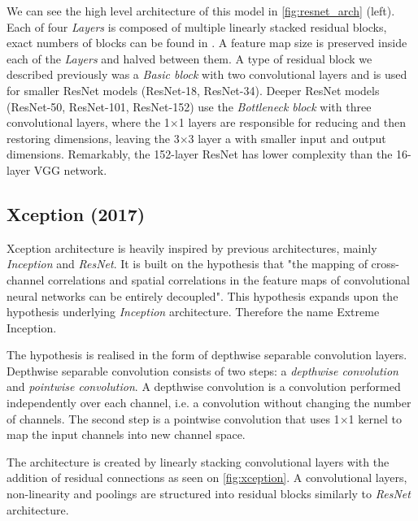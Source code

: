 We can see the high level architecture of this model in \cref{fig:resnet_arch} (left). Each of four \textit{Layers} is composed of multiple linearly stacked residual blocks, exact numbers of blocks can be found in \cite[table 1]{bib:resnet}. A feature map size is preserved inside each of the \textit{Layers} and halved between them. A type of residual block we described previously was a \textit{Basic block} with two convolutional layers and is used for smaller ResNet models (ResNet-18, ResNet-34). Deeper ResNet models (ResNet-50, ResNet-101, ResNet-152) use the \textit{Bottleneck block} with three convolutional layers, where the 1$\times$1 layers are responsible for reducing and then restoring dimensions, leaving the 3$\times$3 layer a with smaller input and output dimensions. Remarkably, the 152-layer ResNet has lower complexity than the 16-layer VGG network.



\subsection{Xception (2017)}
\label{sec:xception}
Xception architecture \cite{bib:xception} is heavily inspired by previous architectures, mainly \textit{Inception} and \textit{ResNet}. It is built on the hypothesis that "the mapping of cross-channel correlations and spatial correlations in the feature maps of convolutional neural networks can be
entirely decoupled". This hypothesis expands upon the hypothesis underlying \textit{Inception} architecture. Therefore the name Extreme Inception. 

The hypothesis is realised in the form of depthwise separable convolution layers. Depthwise separable convolution consists of two steps: a \textit{depthwise convolution} and \textit{pointwise convolution}. A depthwise convolution is a convolution performed independently over each channel, i.e. a convolution without changing the number of channels. The second step is a pointwise convolution that uses 1$\times$1 kernel to map the input channels into new channel space.

The architecture is created by linearly stacking convolutional layers with the addition of residual connections as seen on \cref{fig:xception}. A convolutional layers, non-linearity and poolings are structured into residual blocks similarly to \textit{ResNet} architecture.

